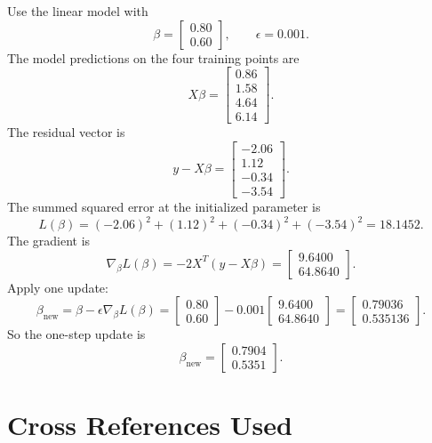 \documentclass[11pt]{article}
\begin{document}
Use the linear model with
\[
\beta=
\begin{bmatrix}
0.80\\
0.60
\end{bmatrix},
\qquad
\epsilon=0.001.
\]
The model predictions on the four training points are
\[
X\beta=
\begin{bmatrix}
0.86\\
1.58\\
4.64\\
6.14
\end{bmatrix}.
\]
The residual vector is
\[
y-X\beta=
\begin{bmatrix}
-2.06\\
1.12\\
-0.34\\
-3.54
\end{bmatrix}.
\]
The summed squared error at the initialized parameter is
\[
L(\beta)=(-2.06)^2+(1.12)^2+(-0.34)^2+(-3.54)^2=18.1452.
\]
The gradient is
\[
\nabla_\beta L(\beta)=-2X^T(y-X\beta)
=
\begin{bmatrix}
9.6400\\
64.8640
\end{bmatrix}.
\]
Apply one update:
\[
\beta_{\text{new}}
=
\beta-\epsilon\nabla_\beta L(\beta)
=
\begin{bmatrix}
0.80\\
0.60
\end{bmatrix}
-0.001
\begin{bmatrix}
9.6400\\
64.8640
\end{bmatrix}
=
\begin{bmatrix}
0.79036\\
0.535136
\end{bmatrix}.
\]
So the one-step update is
\[
\boxed{
\beta_{\text{new}}
=
\begin{bmatrix}
0.7904\\
0.5351
\end{bmatrix}.}
\]

\section*{Cross References Used}
\end{document}
